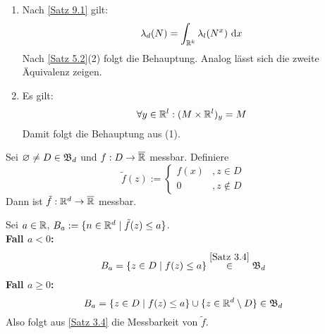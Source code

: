 \documentclass[a4paper,twoside,DIV15,BCOR12mm,chapterprefix=true,headings=onelinechapter]{scrbook}
\begin{document}
\begin{beweis}
\begin{enumerate}
\item Nach \ref{Satz 9.1} gilt:
\[\lambda_d(N)=\int_{\mathbb{R}^k}\lambda_l(N^x)\text{ d}x\]
Nach \ref{Satz 5.2}(2) folgt die Behauptung. Analog lässt sich die zweite Äquivalenz zeigen.
\item Es gilt:
\[\forall y\in\mathbb{R}^l:(M\times\mathbb{R}^l)_y=M\]
Damit folgt die Behauptung aus (1).
\end{enumerate}
\end{beweis}

\begin{lemma}
\label{Lemma 9.3}
Sei $\varnothing\ne D\in\mathfrak{B}_d$ und $f:D\to\overline{\mathbb{R}}$ messbar. Definiere
\[\tilde f(z):=\begin{cases} f(x) &,z\in D\\ 0&,z\not\in D\end{cases}\]
Dann ist $\tilde f:\mathbb{R}^d\to\overline{\mathbb{R}}$ messbar.
\end{lemma}

\begin{beweis}
Sei $a\in\mathbb{R}$, $B_a:=\{n\in\mathbb{R}^d\mid \tilde f(z)\le a\}$.\\
\textbf{Fall $a<0$:}
\[B_a=\{z\in D\mid f(z)\le a\}\stackrel{\ref{Satz 3.4}}\in\mathfrak{B}_d\]
\textbf{Fall $a\ge0$:}
\[B_a=\{z\in D\mid f(z)\le a\}\cup \{z\in\mathbb{R}^d\setminus D\}\in\mathfrak{B}_d\]
Also folgt aus \ref{Satz 3.4} die Messbarkeit von $\tilde f$.
\end{beweis}
\end{document}

